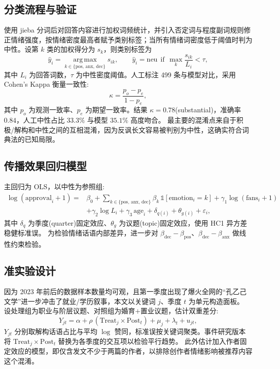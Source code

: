 \documentclass[11pt,a4paper]{ctexart}
\begin{document}
\subsection{分类流程与验证}
使用 jieba 分词后对回答内容进行加权词频统计，并引入否定词与程度副词规则修正情绪强度，按情绪密度最高者赋予类别标签；当所有情绪词密度低于阈值时判为中性。设第 $k$ 类的加权得分为 $s_k$，则类别标签为
\begin{equation}
\hat{y}_i = \operatorname*{arg\,max}_{k\in\{\mathrm{pos},\,\mathrm{anx},\,\mathrm{dec}\}} s_{ik},
\qquad \hat{y}_i = \mathrm{neu}\ \ \text{if}\ \ \max_{k}\frac{s_{ik}}{L_i} < \tau,
\end{equation}
其中 $L_i$ 为回答词数，$\tau$ 为中性密度阈值。人工标注 499 条与模型对比，采用 Cohen's Kappa 衡量一致性:
\begin{equation}
\kappa = \frac{p_o - p_e}{1 - p_e},
\end{equation}
其中 $p_o$ 为观测一致率、$p_e$ 为期望一致率。结果 $\kappa = 0.78$(substantial)，准确率 $0.84$，人工中性占比 $33.3\%$ 与模型 $35.1\%$ 高度吻合。
最主要的混淆点来自于积极/解构和中性之间的互相混淆，因为反讽长文容易被判别为中性，这确实符合词典法的已知局限。

\subsection{传播效果回归模型}
主回归为 OLS，以中性为参照组:
\begin{equation}
\begin{split}
\log(\mathrm{approval}_i + 1) ={}& \beta_0 + \sum_{k\in\{\mathrm{pos},\,\mathrm{anx},\,\mathrm{dec}\}}\beta_k\,\mathbb{1}[\mathrm{emotion}_i = k] + \gamma_1 \log(\mathrm{fans}_i + 1) \\
&+ \gamma_2 \log L_i + \gamma_3\,\mathrm{age}_i + \delta_{q(i)} + \theta_{g(i)} + \varepsilon_i,
\end{split}
\label{eq:ols}
\end{equation}
其中 $\delta_q$ 为季度(quarter)固定效应、$\theta_g$ 为议题(topic)固定效应，使用 HC1 异方差稳健标准误。
为检验情绪话语内部差异，进一步对 $\beta_{\mathrm{dec}}-\beta_{\mathrm{pos}}$、$\beta_{\mathrm{dec}}-\beta_{\mathrm{anx}}$ 做线性约束检验。

\subsection{准实验设计}
因为 2023 年前后的数据样本数量均可观，且第一季度出现了爆火全网的“孔乙己文学”进一步冲击了就业/学历叙事，本文以关键词 $j$、季度 $t$ 为单元构造面板。
设处理组为职业与阶层议题、对照组为婚育$+$置业议题，估计双重差分:
\begin{equation}
Y_{jt} = \alpha + \rho\,(\mathrm{Treat}_j \times \mathrm{Post}_t) + \mu_j + \lambda_t + u_{jt},
\label{eq:did}
\end{equation}
$Y_{jt}$ 分别取解构话语占比与平均 $\log$ 赞同，标准误按关键词聚类。事件研究版本将 $\mathrm{Treat}_j\times\mathrm{Post}_t$ 替换为各季度的交互项以检验平行趋势。
此外估计加入作者固定效应的模型，即仅含发文不少于两篇的作者，以排除创作者情绪影响被推荐内容这个混淆。
\end{document}
